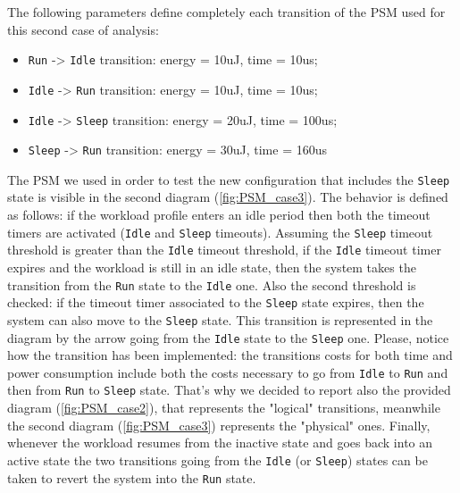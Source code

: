 \documentclass[a4paper]{article}
\begin{document}
            The following parameters define completely each transition of the PSM used for this second case of analysis:
            \begin{itemize}
                \item \texttt{Run} -> \texttt{Idle} transition: energy  = 10uJ, time = 10us;
                \item \texttt{Idle} -> \texttt{Run} transition: energy  = 10uJ, time = 10us;
                \item \texttt{Idle} -> \texttt{Sleep} transition: energy  = 20uJ, time = 100us;
                \item \texttt{Sleep} -> \texttt{Run} transition: energy  = 30uJ, time = 160us
            \end{itemize}

            The PSM we used in order to test the new configuration that includes the \texttt{Sleep} state is visible in the second diagram (\ref{fig:PSM_case3}).
            The behavior is defined as follows: if the workload profile enters an idle period then both the timeout timers are activated (\texttt{Idle} and \texttt{Sleep} timeouts). Assuming the \texttt{Sleep} timeout threshold is greater than the \texttt{Idle} timeout threshold, if the \texttt{Idle} timeout timer expires and the workload is still in an idle state, then the system takes the transition from the \texttt{Run} state to the \texttt{Idle} one.
            Also the second threshold is checked: if the timeout timer associated to the \texttt{Sleep} state expires, then the system can also move to the \texttt{Sleep} state. This transition is represented in the diagram by the arrow going from the \texttt{Idle} state to the \texttt{Sleep} one. Please, notice how the transition has been implemented: the transitions costs for both time and power consumption include both the costs necessary to go from \texttt{Idle} to \texttt{Run} and then from \texttt{Run} to \texttt{Sleep} state. That's why we decided to report also the provided diagram (\ref{fig:PSM_case2}), that represents the "logical" transitions, meanwhile the second diagram (\ref{fig:PSM_case3}) represents the "physical" ones.
            Finally, whenever the workload resumes from the inactive state and goes back into an active state the two transitions going from the \texttt{Idle} (or \texttt{Sleep}) states can be taken to revert the system into the \texttt{Run} state.
\end{document}
